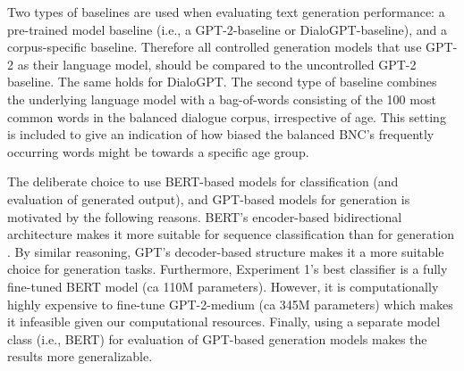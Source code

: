 Two types of baselines are used when evaluating text generation performance: a pre-trained model baseline (i.e., a GPT-2-baseline or DialoGPT-baseline), and a corpus-specific baseline. 
Therefore all controlled generation models that use GPT-2 as their language model, should be compared to the uncontrolled GPT-2 baseline. The same holds for DialoGPT. The second type of baseline combines the underlying language model with a bag-of-words consisting of the 100 most common words in the balanced dialogue corpus, irrespective of age. This setting is included to give an indication of how biased the balanced BNC's frequently occurring words might be towards a specific age group.

The deliberate choice to use BERT-based models for classification (and evaluation of generated output), and GPT-based models for generation is motivated by the following reasons. BERT's encoder-based bidirectional architecture makes it more suitable for sequence classification than for generation \citep{devlin-etal-2019-bert}. By similar reasoning, GPT's decoder-based structure makes it a more suitable choice for generation tasks. Furthermore, Experiment 1's best classifier is a fully fine-tuned BERT model (ca 110M parameters). However, it is computationally highly expensive to fine-tune GPT-2-medium (ca 345M parameters) which makes it infeasible given our computational resources. Finally, using a separate model class (i.e., BERT) for evaluation of GPT-based generation models makes the results more generalizable.






            
